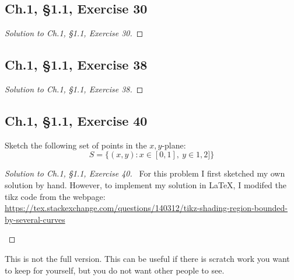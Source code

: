 \documentclass[12pt]{amsart}
\numberwithin{equation}{section}
\theoremstyle{definition}
\theoremstyle{remark}
\newif\ifnotes
\begin{document}


\subsection*{Ch.1, \S 1.1,  Exercise 30} 



\begin{proof}[Solution to Ch.1, \S 1.1,  Exercise 30]

\end{proof}





\subsection*{Ch.1, \S 1.1,  Exercise 38} 



\begin{proof}[Solution to Ch.1, \S 1.1,  Exercise 38]

\end{proof}




\subsection*{Ch.1, \S 1.1,  Exercise 40} 
 Sketch the following set of points in the $x,y$-plane:
$$
S=\{(x,y): x\in [0,1], \ y\in 1,2]\}
$$



\begin{proof}[Solution to Ch.1, \S 1.1,  Exercise 40]
\ 
For this problem I first sketched my own solution by hand.  However, to implement my solution in \LaTeX, I  modifed the tikz code from the webpage: 
\\ 
\url{https://tex.stackexchange.com/questions/140312/tikz-shading-region-bounded-by-several-curves}
\begin{center}
\end{center}

\end{proof}





\ifnotes


\else
	This is not the full version.  This can be useful if there is scratch work you want to keep for yourself, but you do not want other people to see. 
\fi





\end{document}
